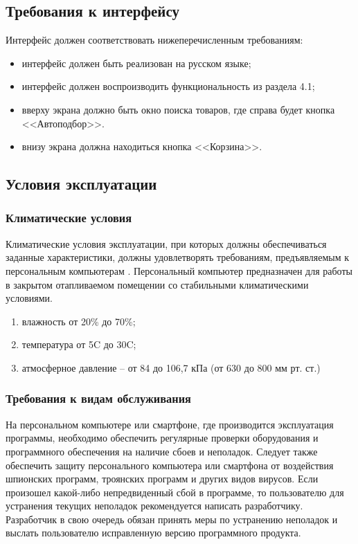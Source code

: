 \documentclass[a4paper,12pt,reqno]{article}
\begin{document}
  \subsection{Требования к интерфейсу}
  Интерфейс должен соответствовать нижеперечисленным требованиям:
  \begin{itemize}
    \item интерфейс должен быть реализован на русском языке;
    \item интерфейс должен воспроизводить функциональность из раздела 4.1;
    \item вверху экрана должно быть окно поиска товаров, где справа будет кнопка <<Автоподбор>>.
    \item внизу экрана должна находиться кнопка <<Корзина>>.
  \end{itemize}

  \subsection{Условия эксплуатации}
  \subsubsection{Климатические условия}
  Климатические условия эксплуатации, при которых должны обеспечиваться заданные характеристики, должны удовлетворять требованиям, предъявляемым к персональным компьютерам \cite{gostclimate}.
  Персональный компьютер предназначен для работы в закрытом отапливаемом помещении со стабильными климатическими условиями.
  \begin{enumerate}
    \item влажность от 20\% до 70\%;
    \item температура от 5\degree C до 30\degree C;
    \item атмосферное давление -- от 84 до 106,7 кПа (от 630 до 800 мм рт. ст.)
  \end{enumerate}


  \subsubsection{Требования к видам обслуживания}
  На персональном компьютере или смартфоне, где производится эксплуатация программы, необходимо обеспечить регулярные проверки оборудования и программного обеспечения на наличие сбоев и неполадок. Следует также обеспечить защиту персонального компьютера или смартфона от воздействия шпионских программ, троянских программ и других видов вирусов.
  Если произошел какой-либо непредвиденный сбой в программе, то пользователю для устранения текущих неполадок рекомендуется написать разработчику. Разработчик в свою очередь обязан принять меры по устранению неполадок и выслать пользователю исправленную версию программного продукта.
\end{document}
